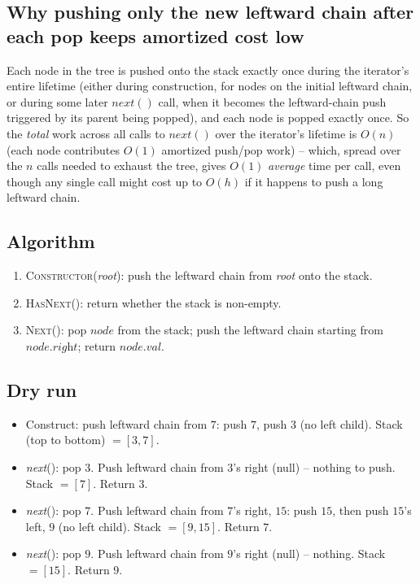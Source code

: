 \subsection*{Why pushing only the new leftward chain after each pop keeps amortized cost low}

Each node in the tree is pushed onto the stack exactly once during the
iterator's entire lifetime (either during construction, for nodes on the
initial leftward chain, or during some later $\textit{next}()$ call,
when it becomes the leftward-chain push triggered by its parent being
popped), and each node is popped exactly once. So the \emph{total} work
across all calls to $\textit{next}()$ over the iterator's lifetime is
$O(n)$ (each node contributes $O(1)$ amortized push/pop work) -- which,
spread over the $n$ calls needed to exhaust the tree, gives $O(1)$
\emph{average} time per call, even though any single call might cost up
to $O(h)$ if it happens to push a long leftward chain.

\subsection*{Algorithm}

\begin{enumerate}
  \item \textsc{Constructor}(\textit{root}): push the leftward chain
        from \textit{root} onto the stack.
  \item \textsc{HasNext}(): return whether the stack is non-empty.
  \item \textsc{Next}(): pop $\textit{node}$ from the stack; push the
        leftward chain starting from $\textit{node}.\textit{right}$;
        return $\textit{node}.\textit{val}$.
\end{enumerate}

\subsection*{Dry run}


\begin{itemize}
  \item Construct: push leftward chain from $7$: push $7$, push $3$ (no
        left child). Stack (top to bottom) $=[3,7]$.
  \item \textit{next}(): pop $3$. Push leftward chain from $3$'s right
        (null) -- nothing to push. Stack $=[7]$. Return $3$.
  \item \textit{next}(): pop $7$. Push leftward chain from $7$'s right,
        $15$: push $15$, then push $15$'s left, $9$ (no left child).
        Stack $=[9,15]$. Return $7$.
  \item \textit{next}(): pop $9$. Push leftward chain from $9$'s right
        (null) -- nothing. Stack $=[15]$. Return $9$.
\end{itemize}

